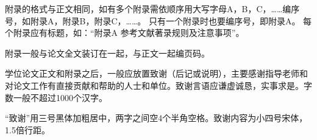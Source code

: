 \documentclass[fontset = mac ms]{seuthesis2024b}
\begin{document}
    附录的格式与正文相同，如有多个附录需依顺序用大写字母A，B，C，……编序号，如附录A，附录B，附录C，……。
    只有一个附录时也要编序号，即附录A。
    每个附录应有标题，如：“附录A 参考文献著录规则及注意事项”。

    附录一般与论文全文装订在一起，与正文一起编页码。
  
  \chapterAck
    学位论文正文和附录之后，一般应放置致谢（后记或说明），主要感谢指导老师和对论文工作有直接贡献和帮助的人士和单位。致谢言语应谦虚诚恳，实事求是。字数一般不超过1000个汉字。

    “致谢”用三号黑体加粗居中，两字之间空4个半角空格。致谢内容为小四号宋体，1.5倍行距。
  
\end{document}
